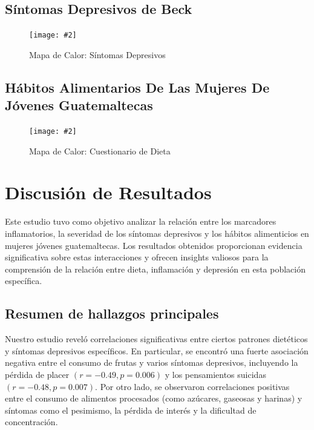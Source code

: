 \documentclass[stu, 12pt]{apa7}
\newcommand{\includegraphicsmax}[2][]{%
	\texttt{[image: \#2]}%
}
\begin{document}
	\subsection{Síntomas Depresivos de Beck}
		\begin{figure}[H]
		\centering
		\includegraphicsmax{sintomasDepresivosBeckGraph.pdf}
		\caption{Mapa de Calor: Síntomas Depresivos}
		\label{fig:Figure2}
	\end{figure}
	\vspace{-1em} %

	\subsection{Hábitos Alimentarios De Las Mujeres De Jóvenes Guatemaltecas}
		\begin{figure}[H]
			\centering
			\includegraphicsmax{dietGraph.pdf}
			\caption{Mapa de Calor: Cuestionario de Dieta}
			\label{fig:Figure3}
		\end{figure}

	\section{Discusión de Resultados}\label{discusiuxf3n-de-resultados}

	Este estudio tuvo como objetivo analizar la relación entre los
	marcadores inflamatorios, la severidad de los síntomas depresivos y los
	hábitos alimenticios en mujeres jóvenes guatemaltecas. Los resultados
	obtenidos proporcionan evidencia significativa sobre estas interacciones
	y ofrecen insights valiosos para la comprensión de la relación entre
	dieta, inflamación y depresión en esta población específica.

	\subsection{Resumen de hallazgos principales}\label{resumen-de-hallazgos-principales}

	Nuestro estudio reveló correlaciones significativas entre ciertos
	patrones dietéticos y síntomas depresivos específicos. En particular, se
	encontró una fuerte asociación negativa entre el consumo de frutas y
	varios síntomas depresivos, incluyendo la pérdida de placer $(r = -0.49,
	p = 0.006)$ y los pensamientos suicidas $(r = -0.48, p = 0.007)$. Por otro
	lado, se observaron correlaciones positivas entre el consumo de
	alimentos procesados (como azúcares, gaseosas y harinas) y síntomas como
	el pesimismo, la pérdida de interés y la dificultad de concentración.\\
\end{document}
